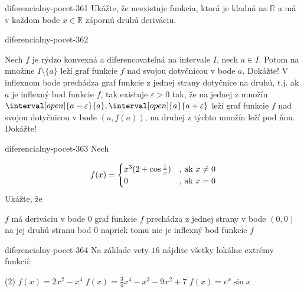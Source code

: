 \begin{defproblem}{diferencialny-pocet-361}
Ukážte, že neexistuje funkcia, ktorá je kladná na $\mathbb{R}$ a má v každom
bode $x\in\mathbb{R}$ zápornú druhú deriváciu.
\end{defproblem}

\begin{defproblem}{diferencialny-pocet-362}
\begin{tasks}
\task
  Nech $f$ je rýdzo konvexná a diferencovateľná na intervale $I$, nech $a\in I$.
  Potom na množine $I\setminus \{a\}$ leží graf funkcie $f$ nad svojou
  dotyčnicou v bode $a$. Dokážte!
\task
  V inflexnom bode prechádza graf funkcie z jednej strany dotyčnice na druhú,
  t.j. ak $a$ je inflexný bod funkcie $f$, tak existuje $\varepsilon >0$ tak, že
  na jednej z množín $\interval[open]{a-\varepsilon}{a},\interval[open]{a}{a +
  \varepsilon}$ leží graf funkcie $f$ nad svojou dotyčnicou v bode $(a,f(a))$,
  na druhej z týchto množín leží pod ňou. Dokážte!
\end{tasks}
\end{defproblem}

\begin{defproblem}{diferencialny-pocet-363}
Nech

\[
  f(x)=
  \begin{cases}
    x^3(2+\cos \frac{1}{x}) & $, ak $ x \neq 0 \\
    0 &  $, ak $ x=0
  \end{cases}
\]
Ukážte, že
\begin{tasks}
  \task
    $f$ má deriváciu v bode $0$
  \task
    graf funkcie $f$ prechádza z jednej strany v bode $(0,0)$ na jej druhú
    stranu
  \task
    bod $0$ napriek tomu nie je inflexný bod funkcie $f$
\end{tasks}
\end{defproblem}

\begin{defproblem}{diferencialny-pocet-364}
Na základe vety $16$ nájdite  všetky lokálne extrémy funkcií:
\begin{tasks}(2)
  \task $f(x)=2x^2-x^4$
  \task $f(x)=\frac{3}{4}x^4-x^3-9x^2+7$
  \task $f(x)=e^x\sin x$
\end{tasks}
\end{defproblem}


